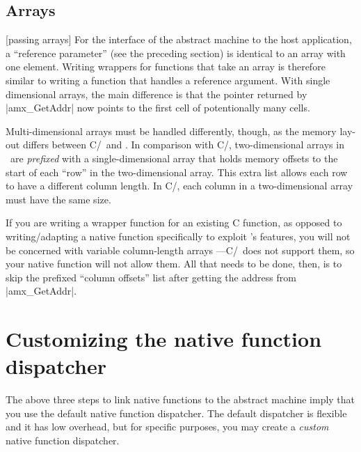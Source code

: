 \subsection{Arrays}
[passing arrays]
For the interface of the abstract machine to the host application, a ``reference
parameter'' (see the preceding section) is identical to an array with one element.
Writing wrappers for functions that take an array is therefore similar to writing
a function that handles a reference argument. With single dimensional arrays,
the main difference is that the pointer returned by |amx_GetAddr| now points to
the first cell of potentionally many cells.

\noindent{}%
Multi-dimensional arrays must be handled differently, though, as the memory lay-out
differs between C/\Cpp\ and \Small. In comparison with C/\Cpp, two-dimensional arrays in
\Small\ are {\it prefixed\/} with a single-dimensional array that holds memory offsets to
the start of each ``row'' in the two-dimensional array. This extra list allows
each row to have a different column length. In C/\Cpp, each column in a two-dimensional
array must have the same size.

If you are writing a wrapper function for an existing C function, as opposed to
writing\slash adapting a native function specifically to exploit \Small's features,
you will not be concerned with variable column-length arrays ---C/\Cpp\ does not
support them, so your native function will not allow them. All that needs to be
done, then, is to skip the prefixed ``column offsets'' list after getting the
address from |amx_GetAddr|.


\section{Customizing the native function dispatcher}
The above three steps to link native functions to the abstract machine imply
that you use the default native function dispatcher. The default dispatcher is
flexible and it has low overhead, but for specific purposes, you may create
a {\it custom\/} native function dispatcher.

